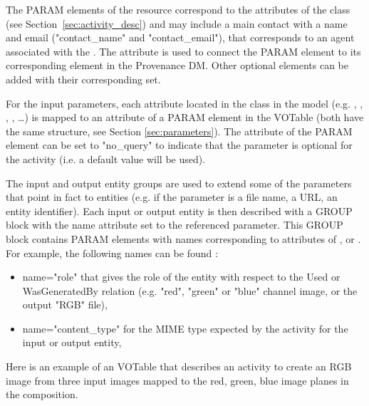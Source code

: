 The PARAM elements of the resource correspond to the attributes of the  class (see Section~\ref{sec:activity_desc}) and may include a main contact with a name and email ("contact\_name" and "contact\_email"), that corresponds to an agent associated with the .
The  attribute is used to connect the PARAM element to its corresponding element in the Provenance DM. Other optional elements can be added with their corresponding  set.

For the input parameters, each attribute located in the  class in the model (e.g. , , , , \dots) is mapped to an attribute of a PARAM element in the VOTable (both have the same structure, see Section \ref{sec:parameters}).
The  attribute of the PARAM element can be set to "no\_query" to indicate that the parameter is optional for the activity (i.e. a default value will be used).

The input and output entity groups are used to extend some of the parameters that point in fact to entities (e.g. if the parameter is a file name, a URL, an entity identifier).
Each input or output entity is then described with a GROUP block with the name attribute set to the referenced parameter. This GROUP block contains PARAM elements with names corresponding to attributes of ,  or .
For example, the following names can be found :
\begin{itemize}
 \item name="role" that gives the role of the entity with respect to the Used or WasGeneratedBy relation (e.g. "red", "green" or "blue" channel image, or the output "RGB" file),
 \item name="content\_type" for the MIME type expected by the activity for the input or output entity,
 \end{itemize} 


Here is an example of an  VOTable that describes an activity to create an RGB image from three input images mapped to the red, green, blue image planes in the composition. 

